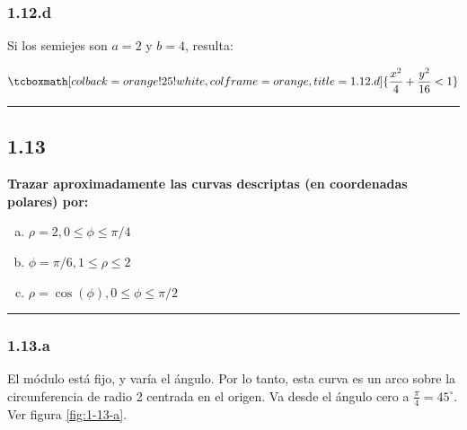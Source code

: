 \documentclass{article}
\begin{document}
\subsubsection*{1.12.d}
\label{subsubsec:1.12.d}

Si los semiejes son $a=2$ y $b=4$, resulta:

\begin{equation}
\tcboxmath[colback=orange!25!white,colframe=orange,title=1.12.d]
{ \frac{x^2}{4} + \frac{y^2}{16} < 1 }
\end{equation}

\hrule
\vspace{10 pt}

\subsection*{1.13}
\label{subsec:1.13}

\textbf{Trazar aproximadamente las curvas descriptas (en coordenadas polares) por:}

\begin{enumerate}[(a)]
\bfseries
\item $\rho = 2, 0 \leq \phi \leq \pi/4$

\item $\phi = \pi/6, 1 \leq \rho \leq 2$

\item $\rho = \cos(\phi), 0 \leq \phi \leq \pi/2$
\end{enumerate}
\hrule

\subsubsection*{1.13.a}
\label{subsubsec:1.13.a}

El módulo está fijo, y varía el ángulo. Por lo tanto, esta curva es un arco sobre la circunferencia de radio 2 centrada en el origen. Va desde el ángulo cero a $\frac{\pi}{4} = 45^{\circ}$. Ver figura \ref{fig:1-13-a}.
\end{document}

